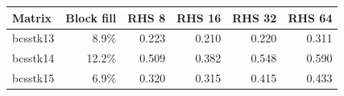 \begin{tabular}{lrrrrr}
\toprule
Matrix & Block fill & RHS 8 & RHS 16 & RHS 32 & RHS 64 \\
\midrule
bcsstk13 & 8.9\% & 0.223 & 0.210 & 0.220 & 0.311 \\
bcsstk14 & 12.2\% & 0.509 & 0.382 & 0.548 & 0.590 \\
bcsstk15 & 6.9\% & 0.320 & 0.315 & 0.415 & 0.433 \\
\bottomrule
\end{tabular}
